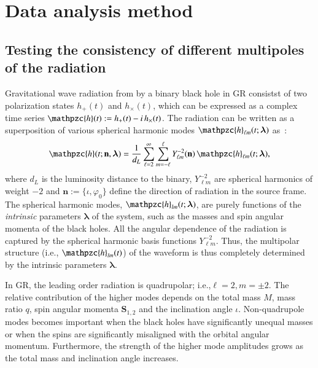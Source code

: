 \documentclass[prd,preprintnumbers,twocolumn,eqsecnum,floatfix,a4paper,nofootinbib,superscriptaddress]{revtex4}
\newcommand{\h}{\mathpzc{h}}
\newcommand{\hlm}{\mathpzc{h}_{\ell m}}
\newcommand{\Ylm}{{Y}^{-2}_{\ell m}}
\newcommand{\blambda}{\bm{\lambda}}
\newcommand{\n}{\mathbf{n}}
\begin{document}
\section{Data analysis method}

\subsection{Testing the consistency of different multipoles of the radiation}

Gravitational wave radiation from by a binary black hole in GR consistst of two polarization states  $h_+(t)$ and $h_\times(t)$, which can be expressed as a complex time series $\h(t) := h_+(t) - i \, h_\times(t)$. The radiation can be written as a superposition of various spherical harmonic modes ${\h}_{\ell m}(t; \blambda)$ as~\cite{NewmanPenrose}:
\begin{equation} 
\h(t; \n, \blambda)= \frac{1}{d_L} \sum _{\ell=2}^{\infty} \sum _{m=-\ell}^{\ell} {\Ylm} (\n) \, {{\hlm}(t; {\blambda})}, 
\label{eq:spherical_harmonics}
\end{equation}
where $d_L$ is the luminosity distance to the binary, ${\Ylm}$ are spherical harmonics of weight $-2$ and $\n := \{\iota, \varphi_0\}$ define the direction of radiation in the source frame. The spherical harmonic modes, ${\h}_{lm}(t; \blambda)$, are purely functions of the \emph{intrinsic} parameters $\blambda$ of the system, such as the masses and spin angular momenta of the black holes. All the angular dependence of the radiation is captured by the spherical harmonic basis functions ${\Ylm}$. Thus, the multipolar structure (i.e., ${\h}_{lm}(t)$) of the waveform  is thus completely determined by the intrinsic parameters $\blambda$. 

 In GR, the leading order radiation is quadrupolar; i.e.,$\ell = 2, m = \pm 2$. The relative contribution of the higher modes depends on the total mass $M$, mass ratio $q$, spin angular momenta ${\mathbf S}_{1,2}$ and the inclination angle $\iota$.  Non-quadrupole modes becomes important when the black holes have  significantly unequal masses or when the spins are significantly misaligned with the orbital angular momentum. Furthermore, the strength of the higher mode amplitudes grows as the total mass and inclination angle increases. 
\end{document}
